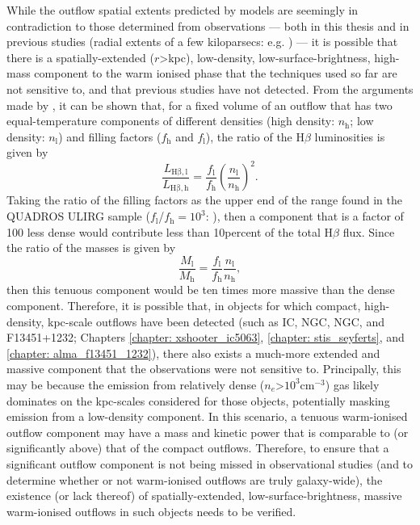 While the outflow spatial extents predicted by models are seemingly in contradiction to those determined from observations --- both in this thesis and in previous studies (radial extents of a few kiloparsecs: e.g. \citealt{VillarMartin2016, Rose2018, Spence2018}) --- it is possible that there is a spatially-extended ($r$\;\textgreater{}\;kpc), low-density, low-surface-brightness, high-mass component to the warm ionised phase that the techniques used so far are not sensitive to, and that previous studies have not detected. From the arguments made by \citet{Spence2018}, it can be shown that, for a fixed volume of an outflow that has two equal-temperature components of different densities (high density: $n_\mathrm{h}$; low density: $n_\mathrm{l}$) and filling factors ($f_\mathrm{h}$ and $f_\mathrm{l}$), the ratio of the H$\beta$ luminosities is given by
\begin{equation}
    \frac{L_\mathrm{H\beta,l}}{L_\mathrm{H\beta,h}}=\frac{f_\mathrm{l}}{f_\mathrm{h}}\left(\frac{n_\mathrm{l}}{n_\mathrm{h}}\right)^2.
    \label{eq: muse_f13451_1232: introduction: l_hbeta_ratio}
\end{equation}
Taking the ratio of the filling factors as the upper end of the range found in the QUADROS ULIRG sample ($f_\mathrm{l}$/$f_\mathrm{h}=10^{3}$: \citealt{Spence2018}), then a component that is a factor of 100 less dense would contribute less than 10\;per\;cent of the total H$\beta$ flux. Since the ratio of the masses is given by
\begin{equation}
    \frac{M_\mathrm{l}}{M_\mathrm{h}}=\frac{f_\mathrm{l}}{f_\mathrm{h}}\frac{n_\mathrm{l}}{n_\mathrm{h}},
    \label{eq: muse_f13451_1232: introduction: mass_ratio}
\end{equation}
then this tenuous component would be ten times more massive than the dense component. Therefore, it is possible that, in objects for which compact, high-density, kpc-scale outflows have been detected (such as IC, NGC, NGC, and F13451+1232; Chapters \ref{chapter: xshooter_ic5063}, \ref{chapter: stis_seyferts}, and \ref{chapter: alma_f13451_1232}), there also exists a much-more extended and massive component that the observations were not sensitive to. Principally, this may be because the emission from relatively dense ($n_e$\;\textgreater\;$10^3$\;cm$^{-3}$) gas likely dominates on the kpc-scales considered for those objects, potentially masking emission from a low-density component. In this scenario, a tenuous warm-ionised outflow component may have a mass and kinetic power that is comparable to (or significantly above) that of the compact outflows. Therefore, to ensure that a significant outflow component is not being missed in observational studies (and to determine whether or not warm-ionised outflows are truly galaxy-wide), the existence (or lack thereof) of spatially-extended, low-surface-brightness, massive warm-ionised outflows in such objects needs to be verified.

